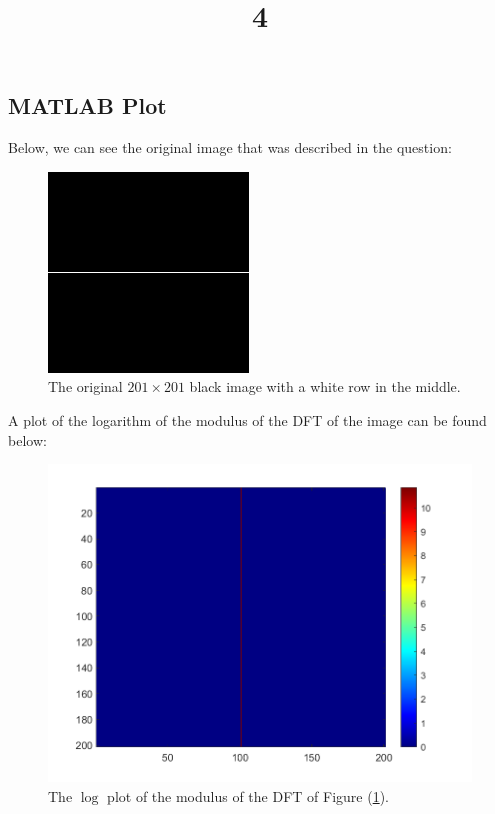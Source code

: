 \documentclass[a4paper]{article}
\title{4}
\date{}
\begin{document}
\maketitle

\subsection{MATLAB Plot}

Below, we can see the original image that was described in the question:
\begin{figure}[h]
\centering
\includegraphics[scale=0.5]{raw_img.png}
\caption{The original $201\times 201$ black image with a white row in the middle.}
\label{f:orig}
\end{figure}

A plot of the logarithm of the modulus of the DFT of the image can be found below:
\begin{figure}[h]
\centering
\includegraphics[scale=0.5]{fft.png}
\caption{The $\log$ plot of the modulus of the DFT of Figure (\ref{f:orig}).}
\end{figure}
\end{document}
